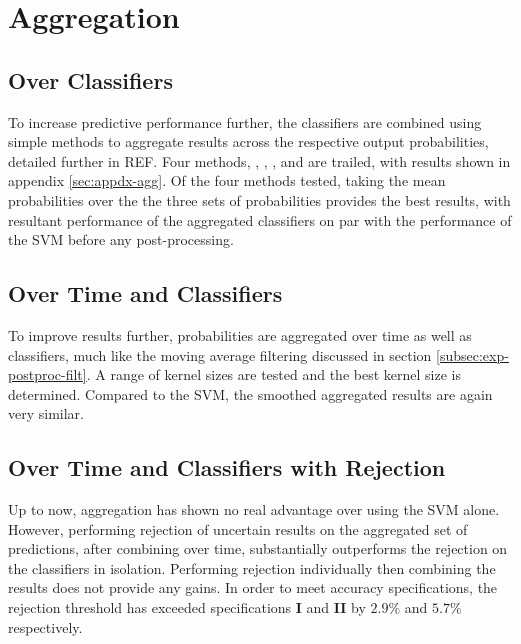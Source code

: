 \section{Aggregation}
\label{sec:exp-agg}

    \subsection{Over Classifiers}
    \label{subsec:exp-agg-clf}
        To increase predictive performance further, the classifiers are combined using simple methods to aggregate results across the respective output probabilities, detailed further in REF. Four methods, , , , and  are trailed, with results shown in appendix \ref{sec:appdx-agg}. Of the four methods tested, taking the mean probabilities over the the three sets of probabilities provides the best results, with resultant performance of the aggregated classifiers on par with the performance of the SVM before any post-processing. 
    
    \subsection{Over Time and Classifiers}
    \label{subsec:exp-agg-time}
        To improve results further, probabilities are aggregated over time as well as classifiers, much like the moving average filtering discussed in section \ref{subsec:exp-postproc-filt}. A range of kernel sizes are tested and the best kernel size is determined. Compared to the SVM, the smoothed aggregated results are again very similar.
        
    \subsection{Over Time and Classifiers with Rejection}
    \label{subsec:exp-agg-rej} 
        Up to now, aggregation has shown no real advantage over using the SVM alone. However, performing rejection of uncertain results on the aggregated set of predictions, after combining over time, substantially outperforms the rejection on the classifiers in isolation. Performing rejection individually then combining the results does not provide any gains. In order to meet accuracy specifications, the rejection threshold has exceeded specifications \textbf{I} and \textbf{II} by $2.9\%$ and $5.7\%$ respectively. 
        
